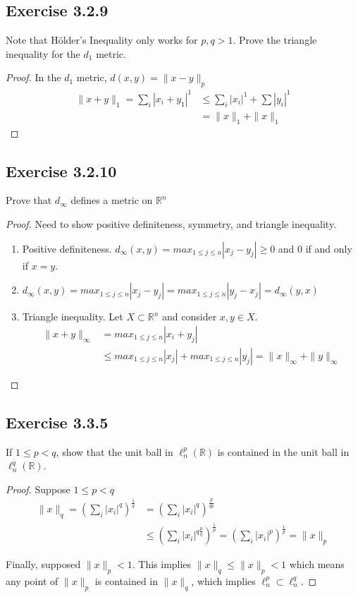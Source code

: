 \documentclass{tufte-book}
\theoremstyle{mytheoremstyle}
\theoremstyle{mylemstyle}
\theoremstyle{mydefstyle}
\begin{document}
\subsection{Exercise 3.2.9}
Note that H{\"o}lder's Inequality only works for $p,q > 1$.  Prove the triangle inequality for the $d_1$ metric.

\begin{proof}
In the $d_1$ metric, $d(x,y) = \|x-y\|_p$
\begin{align*}
 \|x+y\|_1 = \sum_i|x_i+y_1|^1 &\leq \sum_i|x_i|^1 + \sum|y_i|^1 \\
 &= \|x\|_1 + \|x\|_1
\end{align*}
\end{proof}

\subsection{Exercise 3.2.10}
Prove that $d_\infty$ defines a metric on $\mathbb{R}^n$
\begin{proof}
Need to show positive definiteness, symmetry, and triangle inequality.
\begin{enumerate}
\item Positive definiteness. $d_\infty(x,y) = max_{1\leq j\leq n}|x_j-y_j| \geq 0$ and $0$ if and only if $x = y$.

\item $d_\infty(x,y) = max_{1\leq j\leq n}|x_j-y_j| =  max_{1\leq j\leq n}|y_j-x_j| =  d_\infty(y,x)$

\item Triangle inequality.   Let $X \subset \mathbb{R}^n$ and consider $x, y \in X$.
\begin{align*}
\|x+y\|_\infty &= max_{1\leq j\leq n}|x_i+y_j| \\
&\leq max_{1\leq j\leq n}|x_j| + max_{1\leq j\leq n}|y_j| = \|x\|_\infty + \|y\|_\infty
\end{align*}
\end{enumerate}

\end{proof}

\subsection{Exercise 3.3.5}
If $1 \leq p < q$, show that the unit ball in $\ell_n^p(\mathbb{R})$ is contained in the unit ball in $\ell_n^q(\mathbb{R})$.
\begin{proof}
Suppose $1 \leq p < q$
\begin{align*}
\|x\|_q = (\sum_i|x_i|^q)^{\frac{1}{q}} &= (\sum_i|x_i|^q)^{\frac{p}{qp}} \\
&\leq (\sum_i|x_i|^{q\frac{p}{q}})^{\frac{1}{p}} = (\sum_i|x_i|^p)^{\frac{1}{p}} = \|x\|_p
\end{align*}

Finally, supposed $\|x\|_p < 1$.  This implies $\|x\|_q \leq \|x\|_p < 1$ which means any point of $\|x\|_p$ is contained in $\|x\|_q$, which implies $\ell_n^p \subset \ell^q_n$. 

\end{proof}
\end{document}
